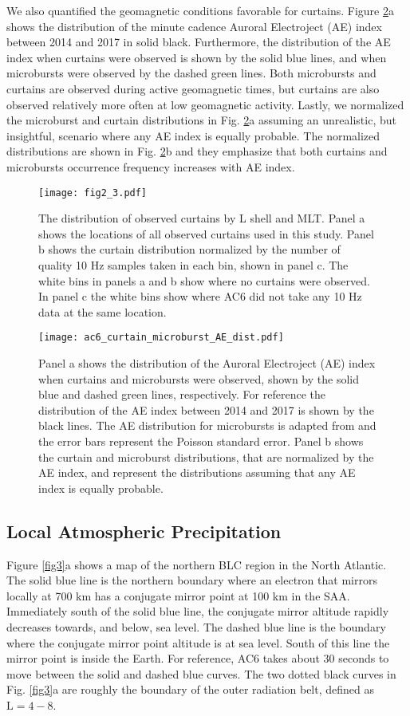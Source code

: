 \documentclass[draft]{agujournal2019}
\begin{document}
We also quantified the geomagnetic conditions favorable for curtains. Figure \ref{ae_dist}a shows the distribution of the minute cadence Auroral Electroject (AE) index between 2014 and 2017 in solid black. Furthermore, the distribution of the AE index when curtains were observed is shown by the solid blue lines, and when microbursts were observed by the dashed green lines. Both microbursts and curtains are observed during active geomagnetic times, but curtains are also observed relatively more often at low geomagnetic activity. Lastly, we normalized the microburst and curtain distributions in Fig. \ref{ae_dist}a assuming an unrealistic, but insightful, scenario where any AE index is equally probable. The normalized distributions are shown in Fig. \ref{ae_dist}b and they emphasize that both curtains and microbursts occurrence frequency increases with AE index.

\begin{figure}
\texttt{[image: fig2\_3.pdf]}
\caption{The distribution of observed curtains by L shell and MLT. Panel a shows the locations of all observed curtains used in this study. Panel b shows the curtain distribution normalized by the number of quality 10 Hz samples taken in each bin, shown in panel c. The white bins in panels a and b show where no curtains were observed. In panel c the white bins show where AC6 did not take any 10 Hz data at the same location.}
\label{l_mlt_dist}
\end{figure}

\begin{figure}
\texttt{[image: ac6\_curtain\_microburst\_AE\_dist.pdf]}
\caption{Panel a shows the distribution of the Auroral Electroject (AE) index when curtains and microbursts were observed, shown by the solid blue and dashed green lines, respectively. For reference the distribution of the AE index between 2014 and 2017 is shown by the black lines. The AE distribution for microbursts is adapted from  and the error bars represent the Poisson standard error. Panel b shows the curtain and microburst distributions, that are normalized by the AE index, and represent the distributions assuming that any AE index is equally probable.}
\label{ae_dist}
\end{figure}

\subsection{Local Atmospheric Precipitation}
Figure \ref{fig3}a shows a map of the northern BLC region in the North Atlantic. The solid blue line is the northern boundary where an electron that mirrors locally at 700 km has a conjugate mirror point at 100 km in the SAA. Immediately south of the solid blue line, the conjugate mirror altitude rapidly decreases towards, and below, sea level. The dashed blue line is the boundary where the conjugate mirror point altitude is at sea level. South of this line the mirror point is inside the Earth. For reference, AC6 takes about 30 seconds to move between the solid and dashed blue curves. The two dotted black curves in Fig. \ref{fig3}a are roughly the boundary of the outer radiation belt, defined as $\mathrm{L}=4-8$.
\end{document}
